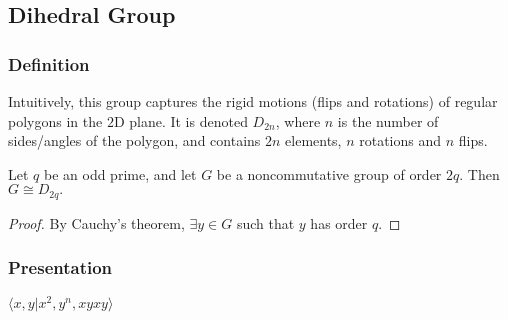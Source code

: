 \subsection{Dihedral Group}\label{dihedralgroup}

\subsubsection{Definition}

Intuitively, this group captures the rigid motions (flips and rotations) of regular polygons in the $2$D plane. It is denoted
$D_{2n}$, where $n$ is the number of sides/angles of the polygon, and contains $2n$ elements, $n$ rotations and $n$ flips.

\begin{proposition}
Let $q$ be an odd prime, and let $G$ be a noncommutative group of order $2q$. Then $G \cong D_{2q}.$
\end{proposition}

\begin{proof}
By Cauchy's theorem, $\exists y \in G$ such that $y$ has order $q$.
\end{proof}

\subsubsection{Presentation}

$\langle x,y | x^2, y^n, xyxy \rangle$